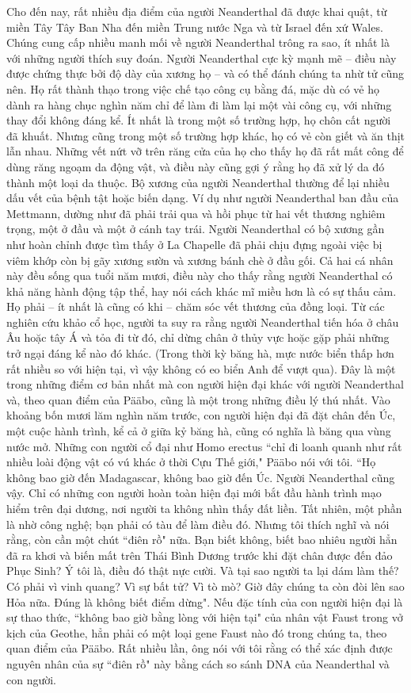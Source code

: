 \begin{multicols}{2}
	Cho đến nay, rất nhiều địa điểm của người Neanderthal đã được khai quật, từ miền Tây Tây Ban Nha đến miền Trung nước Nga và từ Israel đến xứ Wales. Chúng cung cấp nhiều manh mối về người Neanderthal trông ra sao, ít nhất là với những người thích suy đoán. Người Neanderthal cực kỳ mạnh mẽ -- điều này được chứng thực bởi độ dày của xương họ -- và có thể đánh chúng ta nhừ tử cũng nên. Họ rất thành thạo trong việc chế tạo công cụ bằng đá, mặc dù có vẻ họ dành ra hàng chục nghìn năm chỉ để làm đi làm lại một vài công cụ, với những thay đổi không đáng kể. Ít nhất là trong một số trường hợp, họ chôn cất người đã khuất. Nhưng cũng trong một số trường hợp khác, họ có vẻ còn giết và ăn thịt lẫn nhau. Những vết nứt vỡ trên răng cửa của họ cho thấy họ đã rất mất công để dùng răng ngoạm da động vật, và điều này cũng gợi ý rằng họ đã xử lý da đó thành một loại da thuộc. Bộ xương của người Neanderthal thường để lại nhiều dấu vết của bệnh tật hoặc biến dạng. Ví dụ như người Neanderthal ban đầu của Mettmann, dường như đã phải trải qua và hồi phục từ hai vết thương nghiêm trọng, một ở đầu và một ở cánh tay trái. Người Neanderthal có bộ xương gần như hoàn chỉnh được tìm thấy ở La Chapelle đã phải chịu đựng ngoài việc bị viêm khớp còn bị gãy xương sườn và xương bánh chè ở đầu gối. Cả hai cá nhân này đều sống qua tuổi năm mươi, điều này cho thấy rằng người Neanderthal có khả năng hành động tập thể, hay nói cách khác mĩ miều hơn là có sự thấu cảm. Họ phải -- ít nhất là cũng có khi -- chăm sóc vết thương của đồng loại.
	\vskip 0.1cm
	Từ các nghiên cứu khảo cổ học, người ta suy ra rằng người Neanderthal tiến hóa ở châu Âu hoặc tây Á và tỏa đi từ đó, chỉ dừng chân ở thủy vực hoặc gặp phải những trở ngại đáng kể nào đó khác. (Trong thời kỳ băng hà, mực nước biển thấp hơn rất nhiều so với hiện tại, vì vậy không có eo biển Anh để vượt qua). Đây là một trong những điểm cơ bản nhất mà con người hiện đại khác với người Neanderthal và, theo quan điểm của Pääbo, cũng là một trong những điều lý thú nhất. Vào khoảng bốn mươi lăm nghìn năm trước, con người hiện đại đã đặt chân đến Úc, một cuộc hành trình, kể cả ở giữa kỷ băng hà, cũng có nghĩa là băng qua vùng nước mở. Những con người cổ đại như Homo erectus ``chỉ đi loanh quanh như rất nhiều loài động vật có vú khác ở thời Cựu Thế giới," Pääbo nói với tôi. ``Họ không bao giờ đến Madagascar, không bao giờ đến Úc. Người Neanderthal cũng vậy. Chỉ có những con người hoàn toàn hiện đại mới bắt đầu hành trình mạo hiểm trên đại dương, nơi người ta không nhìn thấy đất liền. Tất nhiên, một phần là nhờ công nghệ; bạn phải có tàu để làm điều đó. Nhưng tôi thích nghĩ và nói rằng, còn cần một chút ``điên rồ" nữa. Bạn biết không, biết bao nhiêu người hẳn đã ra khơi và biến mất trên Thái Bình Dương trước khi đặt chân được đến đảo Phục Sinh? Ý tôi là, điều đó thật nực cười. Và tại sao người ta lại dám làm thế? Có phải vì vinh quang? Vì sự bất tử? Vì tò mò? Giờ đây chúng ta còn đòi lên sao Hỏa nữa. Đúng là không biết điểm dừng". Nếu đặc tính của con người hiện đại là sự thao thức, ``không bao giờ bằng lòng với hiện tại" của nhân vật Faust trong vở kịch của Geothe, hẳn phải có một loại gene Faust nào đó trong chúng ta, theo quan điểm của Pääbo. Rất nhiều lần, ông nói với tôi rằng có thể xác định được nguyên nhân của sự ``điên rồ" này bằng cách so sánh DNA của Neanderthal và con người.

\end{multicols}
